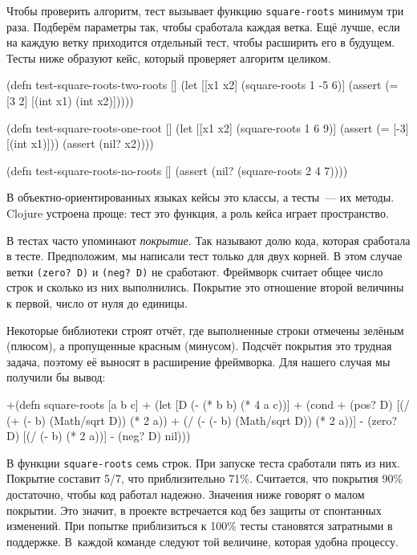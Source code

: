 
Чтобы проверить алгоритм, тест вызывает функцию \verb|square-roots| минимум три
раза. Подберём параметры так, чтобы сработала каждая ветка. Ещё лучше, если на
каждую ветку приходится отдельный тест, чтобы расширить его в будущем. Тесты ниже
образуют кейс, который проверяет алгоритм целиком.

\begin{english}
  \begin{clojure}
(defn test-square-roots-two-roots []
  (let [[x1 x2] (square-roots 1 -5 6)]
    (assert (= [3 2] [(int x1) (int x2)]))))

(defn test-square-roots-one-root []
  (let [[x1 x2] (square-roots 1 6 9)]
    (assert (= [-3] [(int x1)]))
    (assert (nil? x2))))

(defn test-square-roots-no-roots []
  (assert (nil? (square-roots 2 4 7))))
  \end{clojure}
\end{english}

В объектно-ориентированных языках кейсы это классы, а тесты~--- их
методы. Clojure устроена проще: тест это функция, а роль кейса играет
пространство.


В тестах часто упоминают \emph{покрытие}. Так называют долю кода, которая
сработала в тесте. Предположим, мы написали тест только для двух корней. В этом
случае ветки \verb|(zero? D)| и \verb|(neg? D)| не сработают. Фреймворк считает
общее число строк и сколько из них выполнились. Покрытие это отношение второй
величины к первой, число от нуля до единицы.

Некоторые библиотеки строят отчёт, где выполненные строки отмечены зелёным
(плюсом), а пропущенные красным (минусом). Подсчёт покрытия это трудная задача,
поэтому её выносят в расширение фреймворка. Для нашего случая мы получили бы
вывод:

\begin{english}
  \begin{diff}
+(defn square-roots [a b c]
+  (let [D (- (* b b) (* 4 a c))]
+    (cond
+      (pos? D) [(/ (+ (- b) (Math/sqrt D)) (* 2 a))
+                (/ (- (- b) (Math/sqrt D)) (* 2 a))]
-      (zero? D) [(/ (- b) (* 2 a))]
-      (neg? D) nil)))
  \end{diff}
\end{english}

В функции \verb|square-roots| семь строк. При запуске теста сработали пять из
них. Покрытие составит 5/7, что приблизительно 71\%. Считается, что покрытия
90\% достаточно, чтобы код работал надежно. Значения ниже говорят о малом
покрытии. Это значит, в проекте встречается код без защиты от спонтанных
изменений. При попытке приблизиться к 100\% тесты становятся затратными в
поддержке. В~каждой команде следуют той величине, которая удобна процессу.

